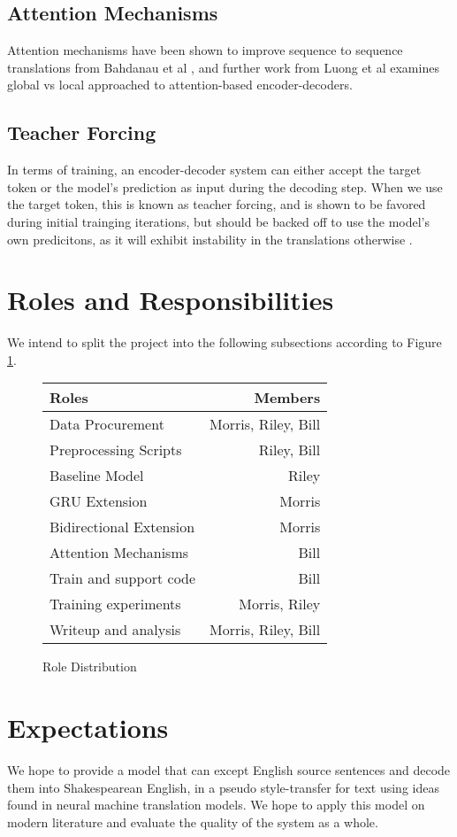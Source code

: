 \documentclass[twoside,twocolumn]{article}
\begin{document}
\subsection{Attention Mechanisms}
Attention mechanisms have been shown to improve sequence to sequence translations from Bahdanau et al \cite{bahdanau2014neural}, and further work from Luong et al \cite{luong2015effective} examines global vs local approached to attention-based encoder-decoders.
\subsection{Teacher Forcing}
In terms of training, an encoder-decoder system can either accept the target token or the model's prediction as input during the decoding step. When we use the target token, this is known as teacher forcing, and is shown to be favored during initial trainging iterations, but should be backed off to use the model's own predicitons, as it will exhibit instability in the translations otherwise \cite{lamb2016professor}.

\section{Roles and Responsibilities}
We intend to split the project into the following subsections according to Figure \ref{fig:roles}.

\begin{figure}
  \centering
  \begin{tabular}{ |l|r| }
      \hline
      \textbf{Roles} & \textbf{Members} \\
      \hline
      Data Procurement & Morris, Riley, Bill \\ \hline
      Preprocessing Scripts & Riley, Bill \\ \hline
      Baseline Model & Riley \\ \hline
      GRU Extension & Morris \\ \hline
      Bidirectional Extension & Morris \\ \hline
      Attention Mechanisms & Bill \\ \hline
      Train and support code & Bill \\ \hline
      Training experiments & Morris, Riley \\ \hline
      Writeup and analysis & Morris, Riley, Bill \\ \hline
  \end{tabular}
  \caption{Role Distribution}
  \label{fig:roles}
\end{figure}

\section{Expectations}
We hope to provide a model that can except English source sentences and decode them into Shakespearean English, in a pseudo style-transfer for text using ideas found in neural machine translation models. We hope to apply this model on modern literature and evaluate the quality of the system as a whole.



\end{document}

